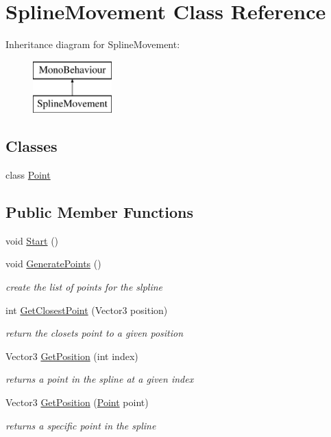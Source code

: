 \hypertarget{class_spline_movement}{}\section{Spline\+Movement Class Reference}
\label{class_spline_movement}
Inheritance diagram for Spline\+Movement\+:\begin{figure}[H]
\begin{center}
\leavevmode
\includegraphics[height=2.000000cm]{class_spline_movement}
\end{center}
\end{figure}
\subsection*{Classes}
\begin{DoxyCompactItemize}
\item 
class \mbox{\hyperlink{class_spline_movement_1_1_point}{Point}}
\end{DoxyCompactItemize}
\subsection*{Public Member Functions}
\begin{DoxyCompactItemize}
\item 
void \mbox{\hyperlink{class_spline_movement_a55ac2dde40f8639ff040dd07fb63b34e}{Start}} ()
\item 
void \mbox{\hyperlink{class_spline_movement_a44f9470b8291c8fff0aa4eb23378623c}{Generate\+Points}} ()
\begin{DoxyCompactList}\small\item\em create the list of points for the slpline \end{DoxyCompactList}\item 
int \mbox{\hyperlink{class_spline_movement_a687a1aedc6e6862ddc34cd3f2bd819ac}{Get\+Closest\+Point}} (Vector3 position)
\begin{DoxyCompactList}\small\item\em return the closets point to a given position \end{DoxyCompactList}\item 
Vector3 \mbox{\hyperlink{class_spline_movement_ad49c7e2dff671d59557385b4b464b2ad}{Get\+Position}} (int index)
\begin{DoxyCompactList}\small\item\em returns a point in the spline at a given index \end{DoxyCompactList}\item 
Vector3 \mbox{\hyperlink{class_spline_movement_a7c6e2706a671008309d50e628c004462}{Get\+Position}} (\mbox{\hyperlink{class_spline_movement_1_1_point}{Point}} point)
\begin{DoxyCompactList}\small\item\em returns a specific point in the spline \end{DoxyCompactList}\end{DoxyCompactItemize}
